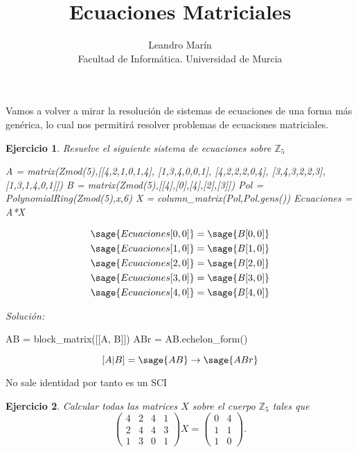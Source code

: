 \documentclass{amsart}
\title{Ecuaciones Matriciales}
\author{Leandro Marín \\ Facultad de Informática. Universidad de Murcia}
\newtheorem{ejer}{Ejercicio}
\begin{document}
\maketitle

Vamos a volver a mirar la resolución de sistemas de ecuaciones de una forma más 
genérica, lo cual nos permitirá resolver problemas de ecuaciones matriciales.

\begin{ejer}
Resuelve el siguiente sistema de ecuaciones sobre ${\mathbb Z}_5$

\begin{sageblock}
A = matrix(Zmod(5),[[4,2,1,0,1,4],
[1,3,4,0,0,1],
[4,2,2,2,0,4],
[3,4,3,2,2,3],
[1,3,1,4,0,1]])
B = matrix(Zmod(5),[[4],[0],[4],[2],[3]])
Pol = PolynomialRing(Zmod(5),x,6)
X = column_matrix(Pol,Pol.gens())
Ecuaciones = A*X
\end{sageblock}


\begin{align*}
\sage{Ecuaciones[0,0]} &= \sage{B[0,0]} \\
\sage{Ecuaciones[1,0]} &= \sage{B[1,0]} \\
\sage{Ecuaciones[2,0]} &= \sage{B[2,0]} \\
\sage{Ecuaciones[3,0]} &= \sage{B[3,0]} \\
\sage{Ecuaciones[4,0]} &= \sage{B[4,0]} \\
\end{align*}
\end{ejer}

{\it Solución:}


\begin{sageblock}
	AB = block_matrix([[A, B]])
	ABr = AB.echelon_form()
\end{sageblock}

$$
	[A|B] = \sage{AB} \to \sage{ABr}
$$

No sale identidad por tanto es un SCI




\begin{ejer}
Calcular todas las matrices $X$ sobre el cuerpo ${\mathbb Z}_5$ tales que 
$$ \left(\begin{array}{rrrr}
4 & 2 & 4 & 1 \\
2 & 4 & 4 & 3 \\
1 & 3 & 0 & 1
\end{array}\right) X 
= \left(\begin{array}{rr}
0 & 4 \\
1 & 1 \\
1 & 0
\end{array}\right).$$
\end{ejer}
\end{document}
